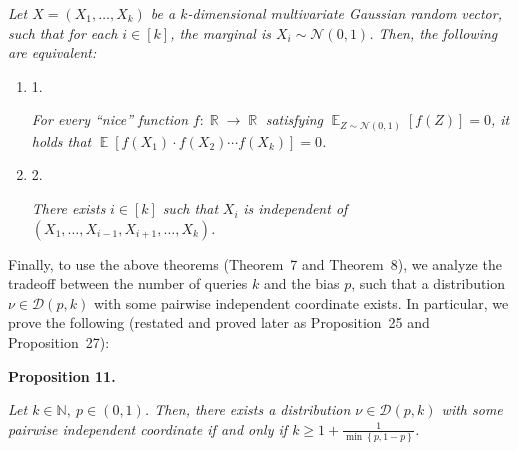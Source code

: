 \documentclass[10pt,a4paper]{article}
\begin{document}
\emph{Let $X=(X_{1},\dots,X_{k})$ be a $k$-dimensional multivariate Gaussian random vector, such that for each $i\in[k]$, the marginal is $X_{i}\sim\mathcal{N}(0,1)$.
Then, the following are equivalent:}\par


\begin{enumerate}


\item[] 
1. 


\emph{For every “nice” function }$f:\mathop{\mathbb{R}}\to\mathop{\mathbb{R}}$\emph{ satisfying }$\mathop{\mathbb{E}}_{Z\sim\mathcal{N}(0,1)}\left[f(Z)\right]=0$\emph{, it holds that }$\mathop{\mathbb{E}}\left[f(X_{1})\cdot f(X_{2})\cdots f(X_{k})\right]=0$\emph{.}\par





\item[] 
2. 


\emph{There exists }$i\in[k]$\emph{ such that }$X_{i}$\emph{ is independent of }$(X_{1},\dots,X_{i-1},X_{i+1},\dots,X_{k})$\emph{.}\par





\end{enumerate}






Finally, to use the above theorems (Theorem 7 and Theorem 8), we analyze the tradeoff between the number of queries $k$ and the bias $p$, such that a distribution $\nu\in\mathcal{D}(p,k)$ with some pairwise independent coordinate exists.
In particular, we prove the following (restated and proved later as Proposition 25 and Proposition 27):\par





\par\medskip\noindent\textbf{
\textbf{Proposition 11}\textbf{.}
}\par



\emph{Let $k\in\mathbb{N},\ p\in(0,1)$.
Then, there exists a distribution $\nu\in\mathcal{D}(p,k)$ with some pairwise independent coordinate if and only if $k\geqslant 1+\frac{1}{\min\left\{p,1-p\right\}}$.}\par
\end{document}
